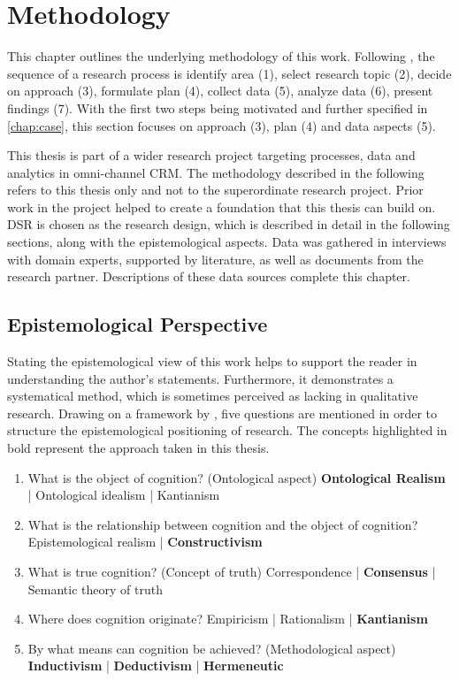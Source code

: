 \chapter{Methodology}
This chapter outlines the underlying methodology of this work. Following \cite{gilljohnson}, the sequence of a research process is identify area (1), select research topic (2), decide on approach (3), formulate plan (4), collect data (5),  analyze data (6), present findings (7). With the first two steps being motivated and further specified in \ref{chap:case}, this section focuses on approach (3), plan (4) and data aspects (5). 

This thesis is part of a wider research project targeting processes, data and analytics in omni-channel CRM. The methodology described in the following refers to this thesis only and not to the superordinate research project. Prior work in the project helped to create a foundation that this thesis can build on. \acrfull{DSR} is chosen as the research design, which is described in detail in the following sections, along with the epistemological aspects. Data was gathered in interviews with domain experts, supported by literature, as well as documents from the research partner. Descriptions of these data sources complete this chapter. 


	\section{Epistemological Perspective}
	\label{sec:epis}
Stating the epistemological view of this work helps to support the reader in understanding the author's statements. Furthermore, it demonstrates a systematical method, which is sometimes perceived as lacking in qualitative research. Drawing on a framework by \cite{becker2007epistemological}, five questions are mentioned in order to structure the epistemological positioning of research. The concepts highlighted in bold represent the approach taken in this thesis. 

\begin{enumerate}
	\item What is the object of cognition? (Ontological aspect)
		\subitem \textbf{Ontological Realism} | Ontological idealism  | Kantianism
	\item What is the relationship between cognition and the object of cognition?
		\subitem Epistemological realism | \textbf{Constructivism}
	\item What is true cognition? (Concept of truth)
		\subitem Correspondence |  \textbf{Consensus} |  Semantic theory of truth
	\item Where does cognition originate?
	\subitem Empiricism | Rationalism | \textbf{Kantianism}
	\item By what means can cognition be achieved? (Methodological aspect)
		\subitem \textbf{Inductivism} | \textbf{Deductivism} | \textbf{Hermeneutic}
\end{enumerate}

